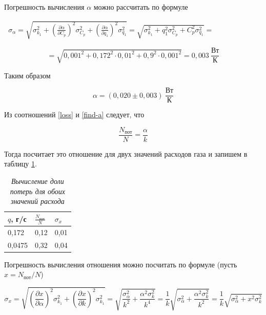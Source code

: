 \documentclass[a4paper,12pt]{article}
\begin{document}
Погрешность вычисления $\alpha$ можно рассчитать по формуле

\begin{multline*}
    \sigma_\alpha = \sqrt{\sigma_{k_1}^2 + \left( \frac{\partial \alpha}{\partial C_p} \right)^2 \sigma_{C_p}^2 + 
    \left( \frac{\partial \alpha}{\partial q_1} \right)^2 \sigma_{q_1}^2
    } = \sqrt{
    \sigma_{k_1}^2 + q_1^2 \sigma_{C_p}^2 + C_p^2 \sigma_{q_1}^2
    } = \ \ \ \ \ \ \ \ \ \ \ \ \ \ \ \ \ \ \ \ \ \ \ \ \ \ \ \ 
\end{multline*}

\begin{equation}
    = \sqrt{0,001^2 + 0,172^2 \cdot 0,01^2 + 0,9^2 \cdot 0,001^2 } = 0,003 \ \frac{\text{Вт}}{\text{К}}
\end{equation}

Таким образом

\begin{equation}
    \alpha = (0,020 \pm 0,003) \ \frac{\text{Вт}}{\text{К}}
\end{equation}

Из соотношений \eqref{loss} и \eqref{find-a} следует, что

\begin{equation}
    \frac{N_\text{пот}}{N} = \frac{\alpha}{k}
\end{equation}

Тогда посчитает это отношение для двух значений расходов газа и запишем в таблицу \ref{q-loss}.

\begin{table}[!ht]
    \centering
    \begin{tabular}{|l|l|l|}
    \hline
        $q$, г/с & $\frac{N_\text{пот}}{N}$ & $\sigma_x$ \\ \hline
        0,172 & 0,12 & 0,01 \\ \hline
        0,0475 & 0,32 & 0,04 \\ \hline
    \end{tabular}\caption{\textit{Вычисление доли потерь для обоих значений расхода}}\label{q-loss}
\end{table}

Погрешность вычисления отношения можно посчитать по формуле (пусть $x = N_\text{пот}/N$)

\begin{equation}
    \sigma_x = \sqrt{
    \left( \frac{\partial x}{\partial \alpha} \right)^2 \sigma_{k_1}^2 + 
    \left( \frac{\partial x}{\partial k} \right)^2 \sigma_{k_1}^2 
    } = \sqrt{
    \frac{\sigma_\alpha^2}{k^2} + \frac{\alpha^2 \sigma_k^2}{k^4}
    } = \frac{1}{k} \sqrt{
    \sigma_\alpha^2 + \frac{\alpha^2 \sigma_k^2}{k^2}
    } = \frac{1}{k} \sqrt{\sigma_\alpha^2 + x^2 \sigma_k^2}
\end{equation}
\end{document}
